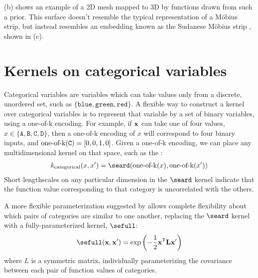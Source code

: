 (b) shows an example of a 2D mesh mapped to 3D by functions drawn from such a prior.
This surface doesn't resemble the typical representation of a M\"{o}bius strip,
but instead resembles an embedding known as the Sudanese M\"{o}bius strip \citep{sudanese1984}, shown in (c).




\section{Kernels on categorical variables}



Categorical variables are variables which can take values only from a discrete, unordered set, such as $\{\texttt{blue}, \texttt{green}, \texttt{red}\}$.
A flexible way to construct a kernel over categorical variables is to represent that variable by a set of binary variables, using a one-of-k encoding.
For example, if ${\bf{x}}$ can take one of four values, $x \in \{ \texttt{A}, \texttt{B}, \texttt{C}, \texttt{D}\}$, then a one-of-k encoding of $x$ will correspond to four binary inputs, and $\operatorname{one-of-k}(\texttt{C}) = [0, 0, 1, 0]$.
Given a one-of-k encoding, we can place any multidimensional kernel on that space, such as the \seard{}:
%
\begin{align}
k_{\textnormal{categorical}}( x, x') = \seard( \oneofk(x), \oneofk(x') )
\end{align}
%
Short lengthscales on any particular dimension in the $\seard$ kernel indicate that the function value corresponding to that category is uncorrelated with the others.

A more flexible parameterization suggested by \citet{swersky2013categorical} allows complete flexibility about which pairs of categories are similar to one another, replacing the $\seard$ kernel with a fully-parameterized kernel, $\sefull$:
%
\begin{align}
\sefull( \vx, \vx') = \exp \left( -\frac{1}{2} \vx\tra \vL \vx' \right)
\end{align}
%
where $L$ is a symmetric matrix, individually parameterizing the covariance between each pair of function values of categories.

